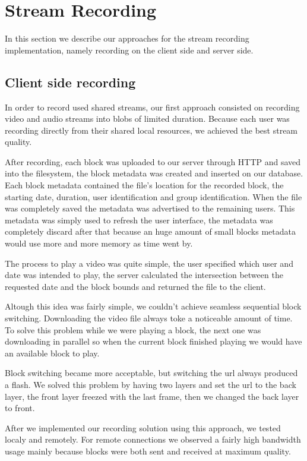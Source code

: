 \section{Stream Recording}
	In this section we describe our approaches for the stream recording implementation, namely recording on the client side and server side.

\subsection{Client side recording}
	In order to record used shared streams, our first approach consisted on recording video and audio streams into blobs of limited duration. Because each user was recording directly from their shared local resources, we achieved the best stream quality.

	After recording, each block was uploaded to our server through \ac{HTTP} and saved into the filesystem, the block metadata was created and inserted on our database. Each block metadata contained the file's location for the recorded block, the starting date, duration, user identification and group identification. When the file was completely saved the metadata was advertised to the remaining users. This metadata was simply used to refresh the user interface, the metadata was completely discard after that because an huge amount of small blocks metadata would use more and more memory as time went by. 

	The process to play a video was quite simple, the user specified which user and date was intended to play, the server calculated the intersection between the requested date and the block bounds and returned the file to the client.

	Altough this idea was fairly simple, we couldn't achieve seamless sequential block switching. Downloading the video file always toke a noticeable amount of time. To solve this problem while we were playing a block, the next one was downloading in parallel so when the current block finished playing we would have an available block to play. 

	Block switching became more acceptable, but switching the url always produced a flash. We solved this problem by having two layers and set the url to the back layer, the front layer freezed with the last frame, then we changed the back layer to front. 

	After we implemented our recording solution using this approach, we tested localy and remotely. For remote connections we observed a fairly high bandwidth usage mainly because blocks were both sent and received at maximum quality. 

